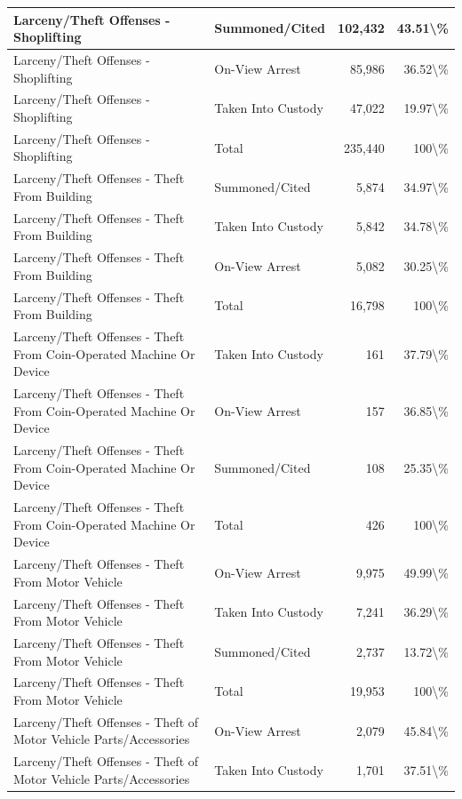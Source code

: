 \documentclass[
]{krantz}
\begin{document}
\begin{longtable}[t]{l|l|r|r}
\hline
Larceny/Theft Offenses - Shoplifting & Summoned/Cited & 102,432 & 43.51\textbackslash{}\%\\
\hline
Larceny/Theft Offenses - Shoplifting & On-View Arrest & 85,986 & 36.52\textbackslash{}\%\\
\hline
Larceny/Theft Offenses - Shoplifting & Taken Into Custody & 47,022 & 19.97\textbackslash{}\%\\
\hline
Larceny/Theft Offenses - Shoplifting & Total & 235,440 & 100\textbackslash{}\%\\
\hline
Larceny/Theft Offenses - Theft From Building & Summoned/Cited & 5,874 & 34.97\textbackslash{}\%\\
\hline
Larceny/Theft Offenses - Theft From Building & Taken Into Custody & 5,842 & 34.78\textbackslash{}\%\\
\hline
Larceny/Theft Offenses - Theft From Building & On-View Arrest & 5,082 & 30.25\textbackslash{}\%\\
\hline
Larceny/Theft Offenses - Theft From Building & Total & 16,798 & 100\textbackslash{}\%\\
\hline
Larceny/Theft Offenses - Theft From Coin-Operated Machine Or Device & Taken Into Custody & 161 & 37.79\textbackslash{}\%\\
\hline
Larceny/Theft Offenses - Theft From Coin-Operated Machine Or Device & On-View Arrest & 157 & 36.85\textbackslash{}\%\\
\hline
Larceny/Theft Offenses - Theft From Coin-Operated Machine Or Device & Summoned/Cited & 108 & 25.35\textbackslash{}\%\\
\hline
Larceny/Theft Offenses - Theft From Coin-Operated Machine Or Device & Total & 426 & 100\textbackslash{}\%\\
\hline
Larceny/Theft Offenses - Theft From Motor Vehicle & On-View Arrest & 9,975 & 49.99\textbackslash{}\%\\
\hline
Larceny/Theft Offenses - Theft From Motor Vehicle & Taken Into Custody & 7,241 & 36.29\textbackslash{}\%\\
\hline
Larceny/Theft Offenses - Theft From Motor Vehicle & Summoned/Cited & 2,737 & 13.72\textbackslash{}\%\\
\hline
Larceny/Theft Offenses - Theft From Motor Vehicle & Total & 19,953 & 100\textbackslash{}\%\\
\hline
Larceny/Theft Offenses - Theft of Motor Vehicle Parts/Accessories & On-View Arrest & 2,079 & 45.84\textbackslash{}\%\\
\hline
Larceny/Theft Offenses - Theft of Motor Vehicle Parts/Accessories & Taken Into Custody & 1,701 & 37.51\textbackslash{}\%\\

\end{longtable}
\end{document}

